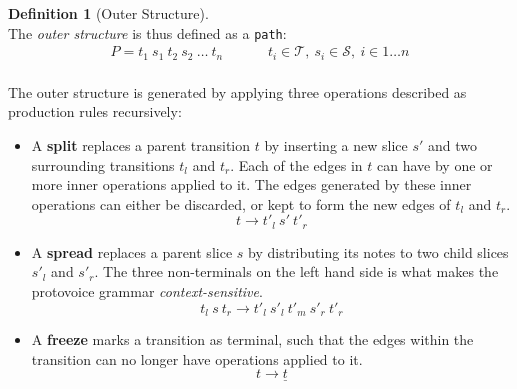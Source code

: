 \documentclass[12pt,a4paper,twoside,openright]{report} \usepackage[pdfborder={0 0 0}]{hyperref}    %
\theoremstyle{definition} \newtheorem{definition}{Definition}[section]
\begin{document}
  \begin{definition}[Outer Structure] ~\\The \textit{outer structure} is thus defined as a \texttt{path}:
    \begin{equation} \begin{aligned} P = t_1~s_1~t_2~s_2~\dots~t_n     &&&& t_i \in \mathcal{T},~s_i \in \mathcal{S},~
    i \in 1\dots n \\ \end{aligned} \label{eq:outerStructureDef} \end{equation} \end{definition}

    The outer structure is generated by applying three operations described as production rules recursively:

    \begin{itemize} \item A \textbf{split} replaces a parent transition $t$ by inserting a new slice $s'$ and two
      surrounding transitions $t_l$ and $t_r$. Each of the edges in $t$ can have by one or more inner operations applied
      to it. The edges generated by these inner operations can either be discarded, or kept to form the new edges of
      $t_l$ and $t_r$. \begin{equation} t \to t'_l~s'~t'_r \label{eq:splitrule} \end{equation} \item A \textbf{spread}
      replaces a parent slice $s$ by distributing its notes to two child slices $s'_l$ and $s'_r$. The three
      non-terminals on the left hand side is what makes the protovoice grammar \textit{context-sensitive}.
      \begin{equation} t_l~s~t_r \to t'_l~s'_l~t'_m~s'_r~t'_r \label{eq:spreadrule} \end{equation} \item
    A \textbf{freeze} marks a transition as terminal, such that the edges within the transition can no longer have
  operations applied to it. \begin{equation} t \to \underline{t} \label{eq:freezerule} \end{equation} \end{itemize}
\end{document}
